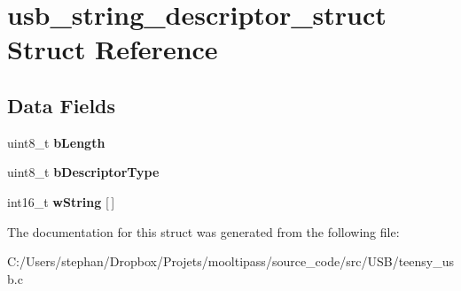 \hypertarget{structusb__string__descriptor__struct}{\section{usb\-\_\-string\-\_\-descriptor\-\_\-struct Struct Reference}
\label{structusb__string__descriptor__struct}
}
\subsection*{Data Fields}
\begin{DoxyCompactItemize}
\item 
\hypertarget{structusb__string__descriptor__struct_a1deca1f1d6e5815b290e6e1015bce5b8}{uint8\-\_\-t {\bfseries b\-Length}}\label{structusb__string__descriptor__struct_a1deca1f1d6e5815b290e6e1015bce5b8}

\item 
\hypertarget{structusb__string__descriptor__struct_a67d7027b9eb9ed268d28e84fbc675707}{uint8\-\_\-t {\bfseries b\-Descriptor\-Type}}\label{structusb__string__descriptor__struct_a67d7027b9eb9ed268d28e84fbc675707}

\item 
\hypertarget{structusb__string__descriptor__struct_a73b6a1a52dd1abac3cef0d39a6e340a5}{int16\-\_\-t {\bfseries w\-String} \mbox{[}$\,$\mbox{]}}\label{structusb__string__descriptor__struct_a73b6a1a52dd1abac3cef0d39a6e340a5}

\end{DoxyCompactItemize}


The documentation for this struct was generated from the following file\-:\begin{DoxyCompactItemize}
\item 
C\-:/\-Users/stephan/\-Dropbox/\-Projets/mooltipass/source\-\_\-code/src/\-U\-S\-B/teensy\-\_\-usb.\-c\end{DoxyCompactItemize}
